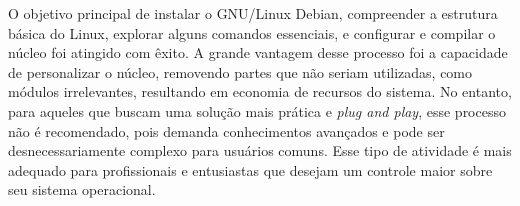 \documentclass[
	12pt,				%
	oneside,   	        %
	a4paper,			%
	english,			%
	french,				%
	spanish,			%
	brazil,				%
	]{pacotes/abntex2}
\begin{document}
O objetivo principal de instalar o GNU/Linux Debian, compreender a estrutura básica do Linux, explorar alguns comandos essenciais, e configurar e compilar o núcleo foi atingido com êxito. A grande vantagem desse processo foi a capacidade de personalizar o núcleo, removendo partes que não seriam utilizadas, como módulos irrelevantes, resultando em economia de recursos do sistema. No entanto, para aqueles que buscam uma solução mais prática e \textit{plug and play}, esse processo não é recomendado, pois demanda conhecimentos avançados e pode ser desnecessariamente complexo para usuários comuns. Esse tipo de atividade é mais adequado para profissionais e entusiastas que desejam um controle maior sobre seu sistema operacional.

\postextual
\renewcommand{\bibsection}{%
\section{\bibname}
\bibmark
\prebibhook}


\end{document}
